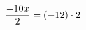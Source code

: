 \documentclass[preview]{standalone}
\begin{document}
\begin{align*}
\special{dvisvgm:raw <g id='unique000'>}\frac{-10 x}{2} = (-12) \cdot 2\special{dvisvgm:raw </g>}
\end{align*}
\end{document}

